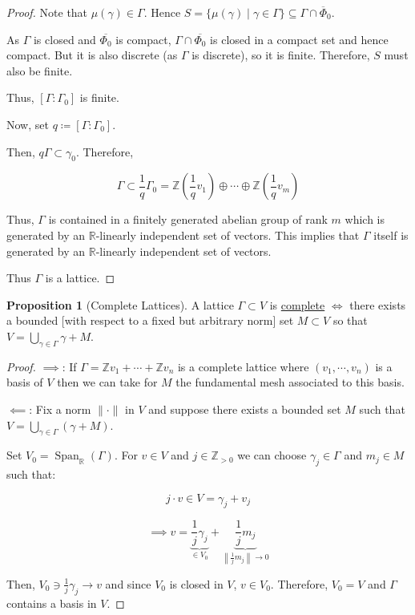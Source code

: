 \documentclass[openany]{amsbook}
\numberwithin{section}{chapter}
\theoremstyle{definition}
\newtheorem{proposition}[theorem]{Proposition}
\begin{document}
\begin{proof}
    Note that $\mu(\gamma) \in \Gamma$. Hence \(S = \{ \mu(\gamma) \mid \gamma \in \Gamma \} \subseteq \Gamma \cap \overline{\Phi}_0\). 

    As $\Gamma$ is closed and $\overline{\Phi_0}$ is compact, \(\Gamma \cap \overline{\Phi_0}\) is closed in a compact set and hence compact. But it is also discrete (as $\Gamma$ is discrete), so it is finite. Therefore, \(S\) must also be finite. 

    Thus, \([\Gamma : \Gamma_0]\) is finite.

    Now, set \(q \coloneqq [\Gamma : \Gamma_0]\).

    Then, \(q \Gamma \subset \gamma_0\). Therefore,

    \[
        \Gamma \subset \frac{1}{q}\Gamma_0 = \mathbb{Z}\left( \frac{1}{q}v_1 \right) \oplus \cdots \oplus \mathbb{Z} \left( \frac{1}{q}v_m \right) 
    \]

    Thus, \(\Gamma\) is contained in a finitely generated abelian group of rank \(m\) which is generated by an $\mathbb R$-linearly independent set of vectors. This implies that \(\Gamma\) itself is generated by an $\mathbb R$-linearly independent set of vectors. 

    Thus \(\Gamma\) is a lattice.

\end{proof}

\begin{proposition}
    [Complete Lattices] A lattice \(\Gamma \subset V\) is \underline{complete} \(\iff\) there exists a bounded [with respect to a fixed but arbitrary norm] set \(M \subset V\) so that \(V = \bigcup_{\gamma \in \Gamma}^{} \gamma +M\). 
\end{proposition}

\begin{proof}
    \(\implies \): If \(\Gamma = \mathbb{Z} v_1 + \cdots + \mathbb{Z} v_n\) is a complete lattice where \((v_1, \cdots , v_n)\) is a basis of \(V\) then we can take for \(M\) the fundamental mesh associated to this basis.

    \(\impliedby\): Fix a norm \(\lVert \cdot \rVert \) in \(V\) and suppose there exists a bounded set \(M\) such that \(V = \bigcup_{\gamma \in \Gamma} (\gamma + M)\). 
    
    Set \(V_0 = \operatorname{Span}_\mathbb{R} (\Gamma)\). For \(v\in V\) and \(j\in \mathbb{Z}_{>0}\) we can choose \(\gamma_j \in \Gamma\) and \(m_j \in M\) such that:

    \[
        j \cdot v \in V = \gamma_j + v_j
    \]

    \[
        \implies v = \underbrace{\frac{1}{j} \gamma_j}_{\in V_0} + \underbrace{\frac{1}{j} m_j}_{\left\lVert \frac{1}{j} m_j \right\rVert \to 0}
    \]

    Then, \(V_0\ni\frac{1}{j} \gamma_j \to v\) and since \(V_0\) is closed in \(V\), \(v\in V_0\). Therefore, \(V_0 = V\) and \(\Gamma\) contains a basis in \(V\). 
\end{proof}
\end{document}

